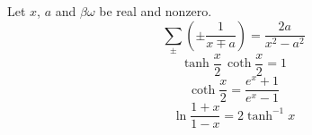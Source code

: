 \documentclass{article}
\begin{document}
Let $x$, $a$ and $\beta\omega$ be real and nonzero.
\begin{equation}
\sum_{\pm} \left(\pm\frac{1}{x \mp a}\right) = \frac{2a}{x^2-a^2}
\label{eq:m1}
\end{equation}
\begin{equation}
\tanh\frac{x}{2}\,\coth\frac{x}{2} = 1
\label{eq:m2}
\end{equation}
\begin{equation}
\coth\frac{x}{2} = \frac{e^{x}+1}{e^{x}-1}
\label{eq:m3}
\end{equation}
\begin{equation}
\ln\frac{1+x}{1-x} = 2\tanh^{-1} x
\label{eq:m4}
\end{equation}
\end{document}
